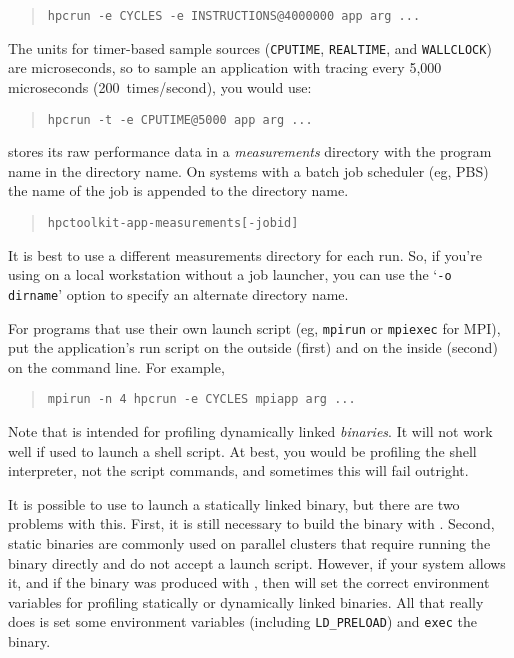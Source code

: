 \begin{quote}
\begin{verbatim}
hpcrun -e CYCLES -e INSTRUCTIONS@4000000 app arg ...
\end{verbatim}
\end{quote}

The units for timer-based sample sources (\verb|CPUTIME|, \verb|REALTIME|, and \verb|WALLCLOCK|) are microseconds,
so to sample an application with tracing every 5,000 microseconds
(200~times/second), you would use:

\begin{quote}
\begin{verbatim}
hpcrun -t -e CPUTIME@5000 app arg ...
\end{verbatim}
\end{quote}

\hpcrun{} stores its raw performance data in a {\it measurements}
directory with the program name in the directory name.  On systems
with a batch job scheduler (eg, PBS) the name of the job is appended
to the directory name.

\begin{quote}
\begin{verbatim}
hpctoolkit-app-measurements[-jobid]
\end{verbatim}
\end{quote}

It is best to use a different measurements directory for each run.
So, if you're using \hpcrun{} on a local workstation without a job
launcher, you can use the `\verb|-o dirname|' option to specify an
alternate directory name.

For programs that use their own launch script (eg, \verb|mpirun| or
\verb|mpiexec| for MPI), put the application's run script on the
outside (first) and \hpcrun{} on the inside (second) on the command
line.  For example,

\begin{quote}
\begin{verbatim}
mpirun -n 4 hpcrun -e CYCLES mpiapp arg ...
\end{verbatim}
\end{quote}

Note that \hpcrun{} is intended for profiling dynamically linked {\it
binaries}.  It will not work well if used to launch a shell script.
At best, you would be profiling the shell interpreter, not the script
commands, and sometimes this will fail outright.

It is possible to use \hpcrun{} to launch a statically linked binary,
but there are two problems with this.  First, it is still necessary to
build the binary with \hpclink{}.  Second, static binaries are
commonly used on parallel clusters that require running the binary
directly and do not accept a launch script.  However, if your system
allows it, and if the binary was produced with \hpclink, then
\hpcrun{} will set the correct environment variables for profiling
statically or dynamically linked binaries.  All that \hpcrun{} really
does is set some environment variables (including \verb|LD_PRELOAD|)
and \verb|exec| the binary.

